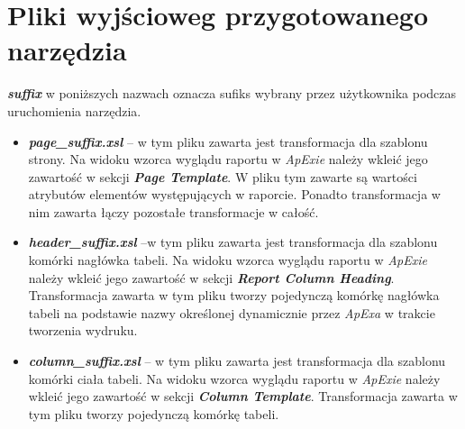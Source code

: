 \documentclass[11pt,a4paper]{article}
\begin{document}
\section{Pliki wyjścioweg przygotowanego narzędzia} \label{app:output}
\emph{\textbf{suffix}} w poniższych nazwach oznacza sufiks wybrany przez użytkownika podczas uruchomienia narzędzia.
\begin{itemize}
	\item \emph{\textbf{page\_suffix.xsl}} -- w tym pliku zawarta jest transformacja dla szablonu strony. Na widoku wzorca wyglądu raportu w \emph{ApExie} należy wkleić jego zawartość w sekcji \emph{\textbf{Page Template}}. W pliku tym zawarte są wartości atrybutów elementów występujących w raporcie. Ponadto transformacja w nim zawarta łączy pozostałe transformacje w całość.
	\item \emph{\textbf{header\_suffix.xsl}} --w tym pliku zawarta jest transformacja dla szablonu komórki nagłówka tabeli. Na widoku wzorca wyglądu raportu w \emph{ApExie} należy wkleić jego zawartość w sekcji \emph{\textbf{Report Column Heading}}. Transformacja zawarta w tym pliku tworzy pojedynczą komórkę nagłówka tabeli na podstawie nazwy określonej dynamicznie przez \emph{ApExa} w trakcie tworzenia wydruku. 
	\item \emph{\textbf{column\_suffix.xsl}} -- w tym pliku zawarta jest transformacja dla szablonu komórki ciała tabeli. Na widoku wzorca wyglądu raportu w \emph{ApExie} należy wkleić jego zawartość w sekcji \emph{\textbf{Column Template}}. Transformacja zawarta w tym pliku tworzy pojedynczą komórkę tabeli.
\end{itemize}
\end{document}
